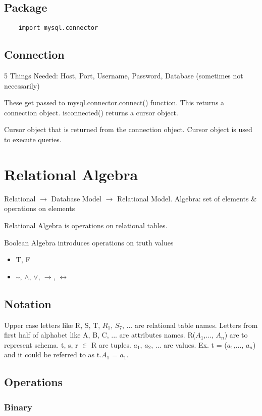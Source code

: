 \documentclass[twoside]{article}
\begin{document}
\subsection*{Package}
\begin{verbatim}
    import mysql.connector
\end{verbatim}

\subsection*{Connection}
5 Things Needed: Host, Port, Username, Password, Database (sometimes not 
necessarily)

These get passed to mysql.connector.connect() function. This returns a 
connection object.
is\textunderscore connected() returns a cursor object.

Cursor object that is returned from the connection object. Cursor object is 
used to execute queries.


\section*{Relational Algebra}
Relational $\longrightarrow$ Database Model $\longrightarrow$ Relational Model.
Algebra: set of elements \& operations on elements

Relational Algebra is operations on relational tables.

Boolean Algebra introduces operations on truth values
\begin{itemize}
    \item T, F
    \item \textasciitilde, $\wedge$, $\vee$, $\rightarrow$, $\leftrightarrow$
\end{itemize}

\subsection*{Notation}
Upper case letters like R, S, T, $R_1$, $S_7$, ... are relational table names.
Letters from first half of alphabet like A, B, C, ... are attributes names.
R($A_1$,..., $A_n$) are to represent schema. t, s, r $\in$ R are tuples. $a_1$, $a_2$, ...
are values. Ex. t = ($a_1$,..., $a_n$) and it could be referred to as t.$A_1$ = $a_1$.

\subsection*{Operations}
\subsubsection*{Binary}
\end{document}
